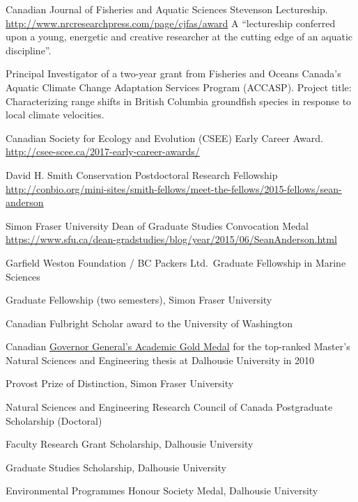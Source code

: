 \begin{description}
\tightlist
\item[2019]
Canadian Journal of Fisheries and Aquatic Sciences Stevenson
Lectureship. \url{http://www.nrcresearchpress.com/page/cjfas/award} A
``lectureship conferred upon a young, energetic and creative researcher
at the cutting edge of an aquatic discipline''.
\item[2018--20]
Principal Investigator of a two-year grant from Fisheries and Oceans
Canada's Aquatic Climate Change Adaptation Services Program (ACCASP).
Project title: Characterizing range shifts in British Columbia
groundfish species in response to local climate velocities.
\item[2017]
Canadian Society for Ecology and Evolution (CSEE) Early Career Award.\\
\url{http://csee-scee.ca/2017-early-career-awards/}
\item[2015]
David H. Smith Conservation Postdoctoral Research Fellowship\\
\url{http://conbio.org/mini-sites/smith-fellows/meet-the-fellows/2015-fellows/sean-anderson}
\item[2015]
Simon Fraser University Dean of Graduate Studies Convocation Medal\\
\url{https://www.sfu.ca/dean-gradstudies/blog/year/2015/06/SeanAnderson.html}
\item[2014]
Garfield Weston Foundation / BC Packers Ltd.\ Graduate Fellowship in
Marine Sciences
\item[2014]
Graduate Fellowship (two semesters), Simon Fraser University
\item[2012--13]
Canadian Fulbright Scholar award to the University of Washington
\item[2011]
Canadian \href{http://goo.gl/nA1zE}{Governor General's Academic Gold
Medal} for the top-ranked Master's Natural Sciences and Engineering
thesis at Dalhousie University in 2010
\item[2011--14]
Provost Prize of Distinction, Simon Fraser University
\item[2011--14]
Natural Sciences and Engineering Research Council of Canada Postgraduate
Scholarship (Doctoral)
\item[2007--10]
Faculty Research Grant Scholarship, Dalhousie University
\item[2007--09]
Graduate Studies Scholarship, Dalhousie University
\item[2007]
Environmental Programmes Honour Society Medal, Dalhousie University
\end{description}

